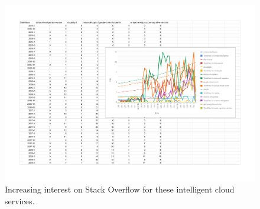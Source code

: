 \begin{figure}[p!]
\centering
\caption[Increasing interest in the developer community of \gls{cvs}]{Increasing interest on Stack Overflow for these intelligent cloud services.}
\label{fig:introduction:stackoverflow-trends}
\includegraphics{mainmatter/introduction/figures/stackoverflow-trends}
\end{figure}

